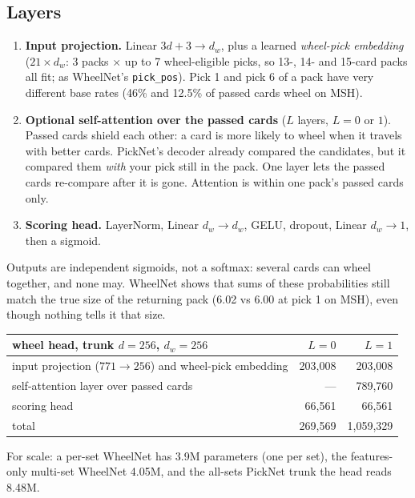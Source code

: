 \documentclass[11pt,letterpaper]{article}
\newcommand{\code}[1]{\texttt{\small #1}}
\begin{document}
\subsection{Layers}

\begin{enumerate}
\item \textbf{Input projection.} Linear $3d+3 \to d_w$, plus a learned \emph{wheel-pick embedding}
($21\times d_w$: 3 packs $\times$ up to 7 wheel-eligible picks, so 13-, 14- and 15-card packs all fit;
as WheelNet's \code{pick\_pos}). Pick 1 and pick 6 of a pack have very different base rates (46\% and 12.5\% of passed cards wheel on MSH).
\item \textbf{Optional self-attention over the passed cards} ($L$ layers, $L=0$ or $1$). Passed cards
shield each other: a card is more likely to wheel when it travels with better cards. PickNet's decoder
already compared the candidates, but it compared them \emph{with} your pick still in the pack. One layer
lets the passed cards re-compare after it is gone. Attention is within one pack's passed cards only.
\item \textbf{Scoring head.} LayerNorm, Linear $d_w\to d_w$, GELU, dropout, Linear $d_w\to1$, then a
sigmoid.
\end{enumerate}

Outputs are independent sigmoids, not a softmax: several cards can wheel together, and none may. WheelNet
shows that sums of these probabilities still match the true size of the returning pack (6.02 vs 6.00 at
pick 1 on MSH), even though nothing tells it that size.

\begin{center}\small
\begin{tabular}{lrr}
\toprule
wheel head, trunk $d=256$, $d_w=256$ & $L=0$ & $L=1$ \\
\midrule
input projection ($771\to256$) and wheel-pick embedding & 203,008 & 203,008 \\
self-attention layer over passed cards & --- & 789,760 \\
scoring head & 66,561 & 66,561 \\
\midrule
total & 269,569 & 1,059,329 \\
\bottomrule
\end{tabular}
\end{center}

\noindent For scale: a per-set WheelNet has 3.9M parameters (one per set), the features-only multi-set WheelNet
4.05M, and the all-sets PickNet trunk the head reads 8.48M.
\end{document}
